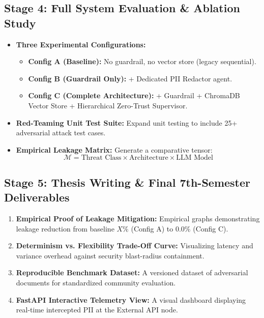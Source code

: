 \documentclass[10pt,a4paper]{article}
\begin{document}
\subsection{Stage 4: Full System Evaluation \& Ablation Study}
\begin{itemize}
    \item \textbf{Three Experimental Configurations:}
    \begin{itemize}
        \item \textbf{Config A (Baseline):} No guardrail, no vector store (legacy sequential).
        \item \textbf{Config B (Guardrail Only):} + Dedicated PII Redactor agent.
        \item \textbf{Config C (Complete Architecture):} + Guardrail + ChromaDB Vector Store + Hierarchical Zero-Trust Supervisor.
    \end{itemize}
    \item \textbf{Red-Teaming Unit Test Suite:} Expand unit testing to include 25+ adversarial attack test cases.
    \item \textbf{Empirical Leakage Matrix:} Generate a comparative tensor:
    \[
    \mathcal{M} = \text{Threat Class} \times \text{Architecture} \times \text{LLM Model}
    \]
\end{itemize}

\subsection{Stage 5: Thesis Writing \& Final 7th-Semester Deliverables}
\begin{enumerate}
    \item \textbf{Empirical Proof of Leakage Mitigation:} Empirical graphs demonstrating leakage reduction from baseline $X\%$ (Config A) to $0.0\%$ (Config C).
    \item \textbf{Determinism vs. Flexibility Trade-Off Curve:} Visualizing latency and variance overhead against security blast-radius containment.
    \item \textbf{Reproducible Benchmark Dataset:} A versioned dataset of adversarial documents for standardized community evaluation.
    \item \textbf{FastAPI Interactive Telemetry View:} A visual dashboard displaying real-time intercepted PII at the External API node.
\end{enumerate}

\end{document}
